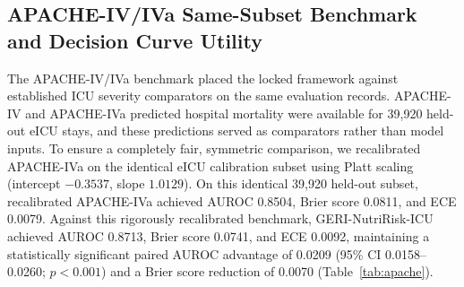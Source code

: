 \documentclass[utf8]{FrontiersinVancouver}
\newcommand{\re}[1]{#1}
\begin{document}
\begin{table}[htbp]
\centering
\caption{Locked GERI-NutriRisk-ICU V14 feature-set and nested domain-update performance in held-out eICU-CRD. Bold values indicate the best value in each displayed metric column; lower Brier score and ECE are better.}
\label{tab:v14_primary}
\end{table}

\subsection{APACHE-IV/IVa Same-Subset Benchmark and Decision Curve Utility}
The APACHE-IV/IVa benchmark placed the locked framework against established ICU severity comparators on the same evaluation records. APACHE-IV and APACHE-IVa predicted hospital mortality were available for 39,920 held-out eICU stays, and these predictions served as comparators rather than model inputs. \re{To ensure a completely fair, symmetric comparison, we recalibrated APACHE-IVa on the identical eICU calibration subset using Platt scaling (intercept $-0.3537$, slope $1.0129$). On this identical 39,920 held-out subset, recalibrated APACHE-IVa achieved AUROC 0.8504, Brier score 0.0811, and ECE 0.0079. Against this rigorously recalibrated benchmark, GERI-NutriRisk-ICU achieved AUROC 0.8713, Brier score 0.0741, and ECE 0.0092, maintaining a statistically significant paired AUROC advantage of 0.0209 (95\% CI 0.0158--0.0260; $p<0.001$) and a Brier score reduction of 0.0070 (Table~\ref{tab:apache}).}
\end{document}
